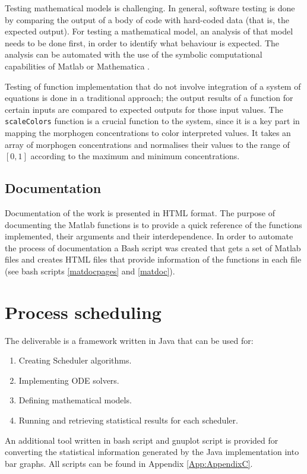 Testing mathematical models is challenging. In general, software testing is done by comparing the output of a body of code with hard-coded data (that is, the expected output). For testing a mathematical model, an analysis of that model needs to be done first, in order to identify what behaviour is expected. The analysis can be automated with the use of the symbolic computational capabilities of Matlab \cite{MATLAB_2010} or Mathematica \cite{mathematica}.

Testing of function implementation that do not involve integration of a system of equations is done in a traditional approach; the output results of a function for certain inputs are compared to expected outputs for those input values. 
The \texttt{scaleColors} function is a crucial function to the system, since it is a key part in mapping the morphogen concentrations to color interpreted values. It takes an array of morphogen concentrations and normalises their values to the range of $[0,1]$ according to the maximum and minimum concentrations. 

\subsection{Documentation}

Documentation of the work is presented in HTML format. The purpose of documenting the Matlab functions is to provide a quick reference of the functions implemented, their arguments and their interdependence. 
In order to automate the process of documentation a Bash script was created that gets a set of Matlab files and creates HTML files that provide information of the functions in each file (see bash scripts \ref{matdocpages} and \ref{matdoc}). 

\section{Process scheduling}

The deliverable is a framework written in Java that can be used for:
\begin{enumerate}
\item Creating Scheduler algorithms.
\item Implementing ODE solvers.
\item Defining mathematical models.
\item Running and retrieving statistical results for each scheduler.
\end{enumerate}
An additional tool written in bash script and gnuplot script is provided for converting the statistical information generated by the Java implementation into bar graphs. All scripts can be found in Appendix \ref{App:AppendixC}. %

